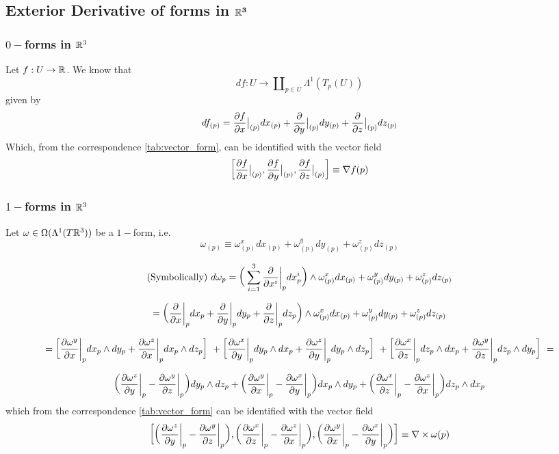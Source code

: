 \subsection{Exterior Derivative of forms in $\mathbf{\mathbb{R}^3}$}
\subsubsection{$0-$forms in $\mathbb{R}^3$}
Let $f:U\to \mathbb{R}$. We know that $$df:U\to \amalg_{p\in U} \Lambda^1(T_p(U))$$
given by $$df_{(p)}=\frac{\partial f}{\partial x}\big{|}_{(p)} dx_{(p)}+\frac{\partial}{\partial y}\big{|}_{(p)} dy_{(p)}+\frac{\partial}{\partial z}\big{|}_{(p)} dz_{(p)} $$
Which, from the correspondence \ref{tab:vector_form}, can be identified with the vector field $$\bigg{[}\frac{\partial f}{\partial x}\big{|}_{(p)}, \frac{\partial f}{\partial y}\big{|}_{(p)}, \frac{\partial f}{\partial z}\big{|}_{(p)} \bigg{]}\equiv \nabla f (p)$$

\subsubsection{$1-$forms in $\mathbb{R}^3$
}
Let $\omega\in \Omega(\Lambda^1(T\mathbb{R}^3))$ be a $1-$form, i.e. $$\omega_{(p)}\equiv \omega^x_{(p)}dx_{(p)}+\omega^y_{(p)}dy_{(p)}+\omega^z_{(p)}dz_{(p)} $$

$$\text{(Symbolically) }d\omega_p=\bigg{(}\sum_{i=1}^3 \frac{\partial}{\partial x^i}\bigg{|}_p dx^i_{p} \bigg{)}\wedge \omega^x_{(p)}dx_{(p)}+\omega^y_{(p)}dy_{(p)}+\omega^z_{(p)}dz_{(p)} $$

$$=\bigg{(}\frac{\partial}{\partial x}\bigg{|}_p dx_{p} + \frac{\partial}{\partial y}\bigg{|}_p dy_{p}+\frac{\partial}{\partial z}\bigg{|}_p dz_{p} \bigg{)}\wedge \omega^x_{(p)}dx_{(p)}+\omega^y_{(p)}dy_{(p)}+\omega^z_{(p)}dz_{(p)}   $$

$$=\bigg{[}\frac{\partial \omega^y}{\partial x}\bigg{|}_p dx_{p}\wedge dy_{p} + \frac{\partial \omega^z}{\partial x}\bigg{|}_p dx_{p}\wedge dz_p\bigg{]} \ +\bigg{[} \frac{\partial \omega^x}{\partial y}\bigg{|}_p dy_{p} \wedge dx_p + \frac{\partial \omega^z}{\partial y}\bigg{|}_p dy_{p}\wedge dz_p\bigg{]} \ +\bigg{[}\frac{\partial \omega^x}{\partial z}\bigg{|}_p dz_{p}\wedge dx_p + \frac{\partial \omega^y}{\partial z}\bigg{|}_p dz_{p} \wedge dy_p\bigg{]} \ =$$

$$  \bigg{(} \frac{\partial \omega^z}{\partial y}\bigg{|}_p- \frac{\partial \omega^y}{\partial z}\bigg{|}_p \bigg{)} dy_p \wedge dz_p + \bigg{(} \frac{\partial \omega^y}{\partial x}\bigg{|}_p- \frac{\partial \omega^x}{\partial y}\bigg{|}_p \bigg{)} dx_p \wedge dy_p + \bigg{(} \frac{\partial \omega^x}{\partial z}\bigg{|}_p- \frac{\partial \omega^z}{\partial x}\bigg{|}_p \bigg{)} dz_p \wedge dx_p  $$ which from the correspondence \ref{tab:vector_form} can be identified with the vector field $$\bigg{[}\bigg{(} \frac{\partial \omega^z}{\partial y}\bigg{|}_p- \frac{\partial \omega^y}{\partial z}\bigg{|}_p \bigg{)}, \bigg{(} \frac{\partial \omega^x}{\partial z}\bigg{|}_p- \frac{\partial \omega^z}{\partial x}\bigg{|}_p \bigg{)}, \bigg{(} \frac{\partial \omega^y}{\partial x}\bigg{|}_p- \frac{\partial \omega^x}{\partial y}\bigg{|}_p \bigg{)} \bigg{]} \equiv \nabla \times \omega(p)$$

